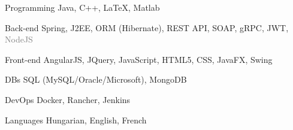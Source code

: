 

\begin{cvskills}


  \cvskill
    {Programming} %
    {Java, C++, LaTeX, Matlab} %

  \cvskill
    {Back-end} %
    {Spring, J2EE, ORM (Hibernate), REST API, SOAP, gRPC, JWT, \textcolor{gray}{NodeJS}} %

  \cvskill
    {Front-end} %
    {AngularJS, JQuery, JavaScript, HTML5, CSS, JavaFX, Swing} %
	
	  
  \cvskill
    {DBs} %
    {SQL (MySQL/Oracle/Microsoft), MongoDB} %


  \cvskill
    {DevOps} %
    {Docker, Rancher, Jenkins} %

  \cvskill
    {Languages} %
    {Hungarian, English, French} %

\end{cvskills}
